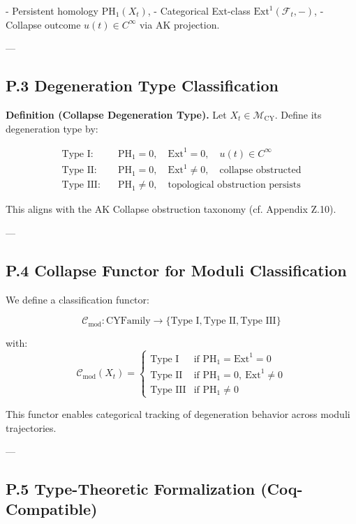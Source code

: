 \documentclass[11pt]{article}
\begin{document}
\begin{axiom}
\begin{axiom}
{{- Persistent homology \( \mathrm{PH}_1(X_t) \),
- Categorical Ext-class \( \mathrm{Ext}^1(\mathcal{F}_t, -) \),
- Collapse outcome \( u(t) \in C^\infty \) via AK projection.

---

\subsection*{P.3 Degeneration Type Classification}

\textbf{Definition (Collapse Degeneration Type).}  
Let \( X_t \in \mathcal{M}_{\mathrm{CY}} \). Define its degeneration type by:

\[
\begin{aligned}
\text{Type I:} &\quad \mathrm{PH}_1 = 0,\quad \mathrm{Ext}^1 = 0,\quad u(t) \in C^\infty \\
\text{Type II:} &\quad \mathrm{PH}_1 = 0,\quad \mathrm{Ext}^1 \neq 0,\quad \text{collapse obstructed} \\
\text{Type III:} &\quad \mathrm{PH}_1 \neq 0,\quad \text{topological obstruction persists}
\end{aligned}
\]

This aligns with the AK Collapse obstruction taxonomy (cf. Appendix Z.10).

---

\subsection*{P.4 Collapse Functor for Moduli Classification}

We define a classification functor:

\[
\mathcal{C}_{\text{mod}} : \mathrm{CYFamily} \to \{ \text{Type I}, \text{Type II}, \text{Type III} \}
\]

with:
\[
\mathcal{C}_{\text{mod}}(X_t) =
\begin{cases}
\text{Type I} & \text{if } \mathrm{PH}_1 = \mathrm{Ext}^1 = 0 \\
\text{Type II} & \text{if } \mathrm{PH}_1 = 0,\ \mathrm{Ext}^1 \neq 0 \\
\text{Type III} & \text{if } \mathrm{PH}_1 \neq 0
\end{cases}
\]

This functor enables categorical tracking of degeneration behavior across moduli trajectories.

---

\subsection*{P.5 Type-Theoretic Formalization (Coq-Compatible)}

}}
\end{axiom}
\end{axiom}
\end{document}
